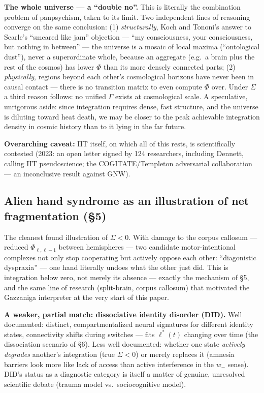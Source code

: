 \documentclass[11pt]{article}
\begin{document}
\textbf{The whole universe --- a ``double no''.} This is literally the combination problem of panpsychism, taken to its limit. Two independent lines of reasoning converge on the same conclusion: (1) \emph{structurally}, Koch and Tononi's answer to Searle's ``smeared like jam'' objection --- ``my consciousness, your consciousness, but nothing in between'' --- the universe is a mosaic of local maxima (``ontological dust''), never a superordinate whole, because an aggregate (e.g.\ a brain plus the rest of the cosmos) has lower $\Phi$ than its more densely connected parts; (2) \emph{physically}, regions beyond each other's cosmological horizons have never been in causal contact --- there is no transition matrix to even compute $\Phi$ over. Under $\Sigma$ a third reason follows: no unified $\Gamma$ exists at cosmological scale. A speculative, unrigorous aside: since integration requires dense, fast structure, and the universe is diluting toward heat death, we may be closer to the peak achievable integration density in cosmic history than to it lying in the far future.

\textbf{Overarching caveat:} IIT itself, on which all of this rests, is scientifically contested (2023: an open letter signed by 124 researchers, including Dennett, calling IIT pseudoscience; the COGITATE/Templeton adversarial collaboration --- an inconclusive result against GNW).

\subsection*{Alien hand syndrome as an illustration of net fragmentation (\S5)}

The cleanest found illustration of $\Sigma<0$. With damage to the corpus callosum --- reduced $\Phi_{\ell,\ell-1}$ between hemispheres --- two candidate motor-intentional complexes not only stop cooperating but actively oppose each other: ``diagonistic dyspraxia'' --- one hand literally undoes what the other just did. This is integration below zero, not merely its absence --- exactly the mechanism of \S5, and the same line of research (split-brain, corpus callosum) that motivated the Gazzaniga interpreter at the very start of this paper.

\textbf{A weaker, partial match: dissociative identity disorder (DID).} Well documented: distinct, compartmentalized neural signatures for different identity states, connectivity shifts during switches --- fits $\ell^*(t)$ changing over time (the dissociation scenario of \S6). Less well documented: whether one state \emph{actively degrades} another's integration (true $\Sigma<0$) or merely replaces it (amnesia barriers look more like lack of access than active interference in the $w_-$ sense). DID's status as a diagnostic category is itself a matter of genuine, unresolved scientific debate (trauma model vs.\ sociocognitive model).
\end{document}
